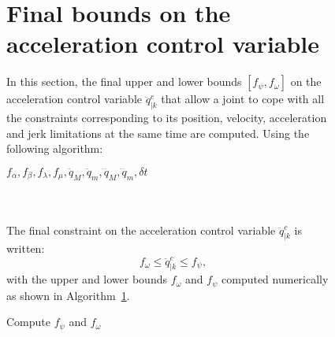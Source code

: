 \begin{figure}[!htbp]
\section{Final bounds on the acceleration control variable}
\label{sec:finalb}
In this section, the final upper and lower bounds $[f_{\psi}, f_{\omega}]$ on the acceleration control variable $\ddot{q}_{|k}^{c}$ that allow a joint to cope with all the  constraints corresponding to its position, velocity, acceleration and jerk limitations at the same time are computed. Using the following algorithm: \\
\noindent\begin{minipage}{\textwidth}
\renewcommand\footnoterule{} 
\begin{algorithm}[H]
\caption{Compute $f_{\psi}$ and $f_{\omega}$}
\label{alg:compute_f_psi_f_omega}
\begin{algorithmic}[1]
\Require $f_{\alpha}, f_{\beta}, f_{\lambda}, f_{\mu}, \ddot{q}_{M},\ddot{q}_{m}, \dddot{q}_{M},\dddot{q}_{m}, \delta t$
\EndIf
{} 
\EndIf
\myState {}\;
\end{algorithmic}
\end{algorithm}
\end{minipage} \\
\\
The final constraint on the acceleration control variable $\ddot{q}_{|k}^{c}$ is written:
\begin{equation}
f_{\omega} \leq \ddot{q}_{|k}^{c} \leq f_{\psi},
\label{eq:qddot_FINAL_CONSTR_1_final}
\end{equation}
with the upper and lower bounds $f_{\omega}$ and $f_{\psi}$ computed numerically as shown in Algorithm~\ref{alg:compute_f_psi_f_omega}. 

\end{figure}
